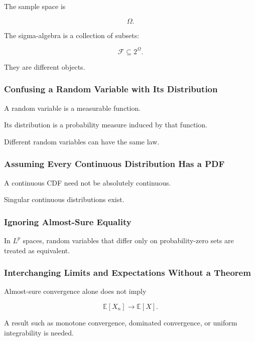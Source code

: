 The sample space is

\[
\Omega.
\]

The sigma-algebra is a collection of subsets:

\[
\mathcal{F}\subseteq2^\Omega.
\]

They are different objects.

\subsubsection{Confusing a Random Variable with Its Distribution}

A random variable is a measurable function.

Its distribution is a probability measure induced by that function.

Different random variables can have the same law.

\subsubsection{Assuming Every Continuous Distribution Has a PDF}

A continuous CDF need not be absolutely continuous.

Singular continuous distributions exist.

\subsubsection{Ignoring Almost-Sure Equality}

In \(L^p\) spaces, random variables that differ only on probability-zero
sets are treated as equivalent.

\subsubsection{Interchanging Limits and Expectations Without a Theorem}

Almost-sure convergence alone does not imply

\[
\mathbb{E}[X_n]\to\mathbb{E}[X].
\]

A result such as monotone convergence, dominated convergence, or uniform
integrability is needed.

